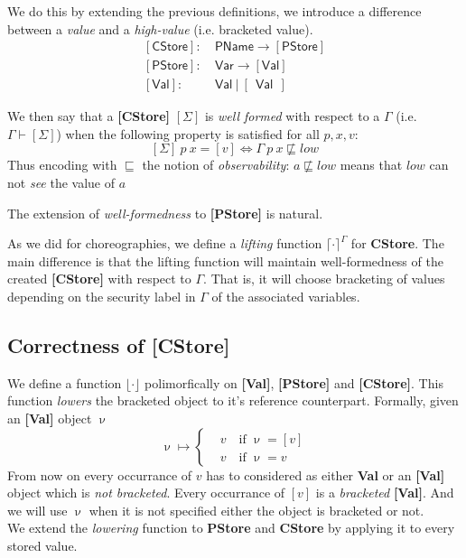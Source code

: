 \documentclass[12pt,a4paper,twoside]{book}
\begin{document}
We do this by extending the previous definitions, we introduce a difference between a \emph{value} and a \emph{high-value} (i.e. bracketed value).
\begin{align*}
	\mathsf{[CStore]}:&~\mathsf{PName} \rightarrow \mathsf{[PStore]}\\
	\mathsf{[PStore]}:&~\mathsf{Var} \rightarrow \mathsf{[Val]}\\
	\mathsf{[Val]}:&~ \mathsf{Val}~|~[~~\mathsf{Val}~~]
\end{align*}

We then say that a \textbf{[CStore]} $[\Sigma]$ is \emph{well formed} with respect to a $\Gamma$ (i.e. $\Gamma \vdash [\Sigma]$) when the following property is satisfied for all $p, x, v$:
$$
	[\Sigma]~p~x = [v] \iff \Gamma~p~x \not\sqsubseteq low
$$
Thus encoding with $\sqsubseteq$ the notion of \emph{observability}: $a \not\sqsubseteq low$ means that $low$ can not \emph{see} the value of $a$

The extension of \emph{well-formedness} to \textbf{[PStore]} is natural.

As we did for choreographies, we define a \emph{lifting} function $\lceil \cdot \rceil^\Gamma$ for \textbf{CStore}. The main difference is that the lifting function will maintain well-formedness of the created \textbf{[CStore]} with respect to $\Gamma$. That is, it will choose bracketing of values depending on the security label in $\Gamma$ of the associated variables.

\subsection{Correctness of \textbf{[CStore]}}
We define a function $\lfloor \cdot \rfloor$ polimorfically on \textbf{[Val]}, \textbf{[PStore]} and \textbf{[CStore]}. This function \emph{lowers} the bracketed object to it's reference counterpart.
Formally, given an \textbf{[Val]} object $\upnu$
$$
\upnu \mapsto \begin{cases}
	&v \quad \text{if $\upnu = [v]$}\\
    &v \quad \text{if $\upnu = v$}
    \end{cases}
$$
From now on every occurrance of $v$ has to considered as either \textbf{Val} or an \textbf{[Val]} object which is \emph{not bracketed}. Every occurrance of $[v]$ is a \emph{bracketed} \textbf{[Val]}. And we will use $\upnu$ when it is not specified either the object is bracketed or not.\\
We extend the \emph{lowering} function to \textbf{PStore} and \textbf{CStore} by applying it to every stored value.
\end{document}
